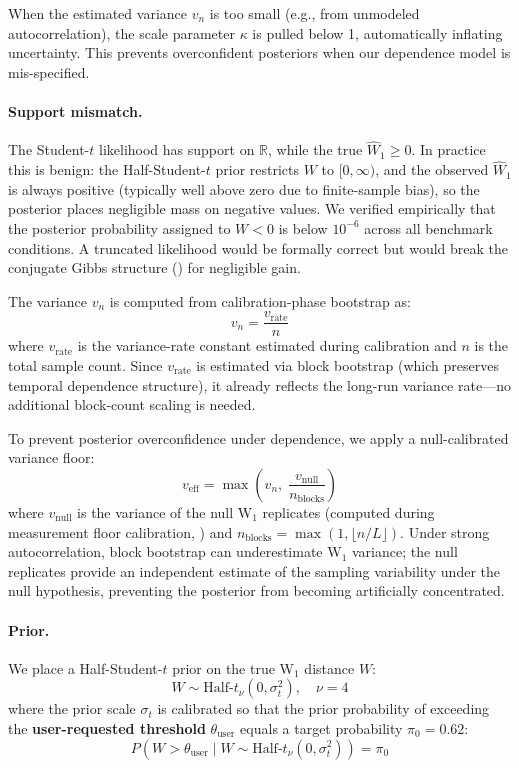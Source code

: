 \documentclass[letterpaper,twocolumn,10pt]{article}
\begin{document}
When the estimated variance $v_n$ is too small (e.g., from unmodeled autocorrelation), the
scale parameter $\kappa$ is pulled below 1, automatically inflating uncertainty. This prevents
overconfident posteriors when our dependence model is mis-specified.

\paragraph{Support mismatch.}
The Student-$t$ likelihood has support on $\mathbb{R}$, while the true $\widehat{W}_1 \geq 0$.
In practice this is benign: the Half-Student-$t$ prior restricts $W$ to $[0, \infty)$, and
the observed $\widehat{W}_1$ is always positive (typically well above zero due to finite-sample
bias), so the posterior places negligible mass on negative values. We verified empirically that
the posterior probability assigned to $W < 0$ is below $10^{-6}$ across all benchmark conditions.
A truncated likelihood would be formally correct but would break the conjugate Gibbs structure
() for negligible gain.

The variance $v_n$ is computed from calibration-phase bootstrap as:
\begin{equation}
v_n = \frac{v_{\text{rate}}}{n}
\end{equation}
where $v_{\text{rate}}$ is the variance-rate constant estimated during calibration and
$n$ is the total sample count. Since $v_{\text{rate}}$ is estimated via block bootstrap
(which preserves temporal dependence structure), it already reflects the long-run
variance rate---no additional block-count scaling is needed.

To prevent posterior overconfidence under dependence, we apply a null-calibrated
variance floor:
\begin{equation}
v_{\text{eff}} = \max\!\left(v_n,\; \frac{v_{\text{null}}}{n_{\text{blocks}}}\right)
\end{equation}
where $v_{\text{null}}$ is the variance of the null W$_1$ replicates (computed during
measurement floor calibration, ) and $n_{\text{blocks}} = \max(1, \lfloor n/L \rfloor)$.
Under strong autocorrelation, block bootstrap can underestimate W$_1$ variance;
the null replicates provide an independent estimate of the sampling variability
under the null hypothesis, preventing the posterior from becoming artificially
concentrated.

\paragraph{Prior.}
We place a Half-Student-$t$ prior on the true W$_1$ distance $W$:
\begin{equation}
W \sim \text{Half-}t_\nu(0, \sigma_t^2), \quad \nu = 4
\end{equation}
where the prior scale $\sigma_t$ is calibrated so that the prior probability of exceeding
the \textbf{user-requested threshold} $\theta_{\text{user}}$ equals a target probability
$\pi_0 = 0.62$:
\begin{equation}
P\!\left(W > \theta_{\text{user}} \mid W \sim \text{Half-}t_\nu(0, \sigma_t^2)\right) = \pi_0
\end{equation}
\end{document}
